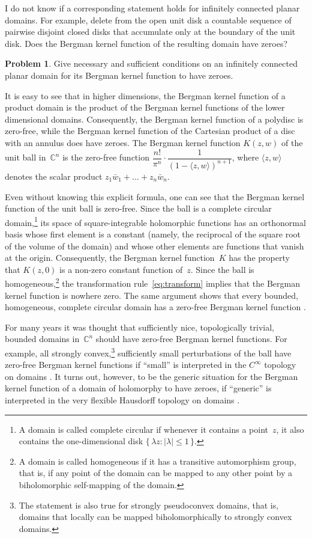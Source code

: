 \documentclass[12pt]{amsart}
\theoremstyle{definition}
\newtheorem{problem}{Problem}
\newcommand{\C}{\mathbb{C}}
\begin{document}
I do not know if a corresponding statement holds for infinitely
connected planar domains. For example, delete from the open unit
disk a countable sequence of pairwise disjoint closed disks that
accumulate only at the boundary of the unit disk. Does the
Bergman kernel function of the resulting domain have zeroes?

\begin{problem}
  Give necessary and sufficient conditions on an infinitely
  connected planar domain for its Bergman kernel function to have
  zeroes.
\end{problem}

It is easy to see that in higher dimensions, the Bergman kernel
function of a product domain is the product of the Bergman kernel
functions of the lower dimensional domains. Consequently, the
Bergman kernel function of a polydisc is zero-free, while the
Bergman kernel function of the Cartesian product of a disc with
an annulus does have zeroes. The Bergman kernel function
\(K(z,w)\) of the unit ball in~\(\C^n\) is the zero-free function
\(\dfrac{n!}{\pi^n}\cdot \dfrac{1}{(1-\langle
z,w\rangle)^{n+1}}\), where \(\langle z,w\rangle\) denotes the
scalar product \(z_1\bar w_1 + \dots + z_n \bar w_n\).

Even without knowing this explicit formula, one can see that the
Bergman kernel function of the unit ball is zero-free.  Since the
ball is a complete circular domain,\footnote{A domain is called
  complete circular if whenever it contains a point~\(z\), it
  also contains the one-dimensional disk \(\{\,\lambda z:
  |\lambda|\le1\,\}\).}  its space of square-integrable
holomorphic functions has an orthonormal basis whose first
element is a constant (namely, the reciprocal of the square root
of the volume of the domain) and whose other elements are
functions that vanish at the origin.  Consequently, the Bergman
kernel function~\(K\) has the property that \(K(z,0)\) is a
non-zero constant function of~\(z\). Since the ball is
homogeneous,\footnote{A domain is called homogeneous if it has a
  transitive automorphism group, that is, if any point of the
  domain can be mapped to any other point by a biholomorphic
  self-mapping of the domain.}  the transformation
rule~\eqref{eq:transform} implies that the Bergman kernel
function is nowhere zero. The same argument shows that every
bounded, homogeneous, complete circular domain has a zero-free
Bergman kernel function \cite{belldavid}.

For many years it was thought that sufficiently nice,
topologically trivial, bounded domains in~\(\C^n\) should have
zero-free Bergman kernel functions. For example, all strongly
convex,\footnote{The statement is also true for strongly
  pseudoconvex domains, that is, domains that locally can be
  mapped biholomorphically to strongly convex domains.}
sufficiently small perturbations of the ball have zero-free
Bergman kernel functions if ``small'' is interpreted in the
\(C^\infty\) topology on domains \cite{greenekrantz}.  It turns
out, however, to be the generic situation for the Bergman kernel
function of a domain of holomorphy to have zeroes, if ``generic''
is interpreted in the very flexible Hausdorff topology on domains
\cite{boasgeneric}.
\end{document}
